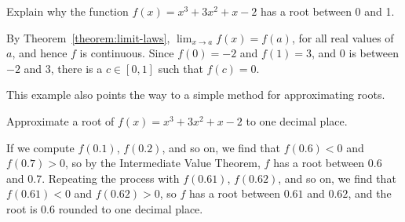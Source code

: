 \begin{example} 
Explain why the function $f(x) =x^3 + 3x^2+x-2$ has a root between 0
and 1.
\end{example}

\begin{solution}
By Theorem~\ref{theorem:limit-laws}, $\lim_{x\to a} f(x) =
f(a)$, for all real values of $a$, and hence $f$ is continuous.  Since
$f(0)=-2$ and $f(1)=3$, and $0$ is between $-2$ and $3$, there is a
$c\in[0,1]$ such that $f(c)=0$.
\end{solution}

This example also points the way to a simple method for approximating
roots. 

\begin{example} 
Approximate a root of $f(x) =x^3 + 3x^2+x-2$ to one decimal place.
\end{example}
\begin{solution}
If we compute $f(0.1)$, $f(0.2)$, and so on, we find that $f(0.6)<0$
and $f(0.7)>0$, so by the Intermediate Value Theorem, $f$ has a root
between $0.6$ and $0.7$. Repeating the process with $f(0.61)$,
$f(0.62)$, and so on, we find that $f(0.61)<0$ and $f(0.62)>0$, so $f$
has a root between $0.61$ and $0.62$, and the root is $0.6$ rounded to
one decimal place.
\end{solution}





